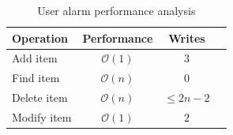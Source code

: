 \documentclass{awac02}
\begin{document}
\begin{table}[ht]
\centering
\begin{tabular}{| l | c | c | c |}
    \hline
    Operation & Performance & Writes \\
    \hline
    Add item & $\mathcal{O}(1)$ & $3$ \\
    Find item & $\mathcal{O}(n)$ & $0$ \\
    Delete item & $\mathcal{O}(n)$ & $\leq 2n - 2$ \\
    Modify item & $\mathcal{O}(1)$ & $2$ \\
    \hline
\end{tabular}
\caption{User alarm performance analysis}
\label{tab:user-alarm-performance}
\end{table}
\end{document}
